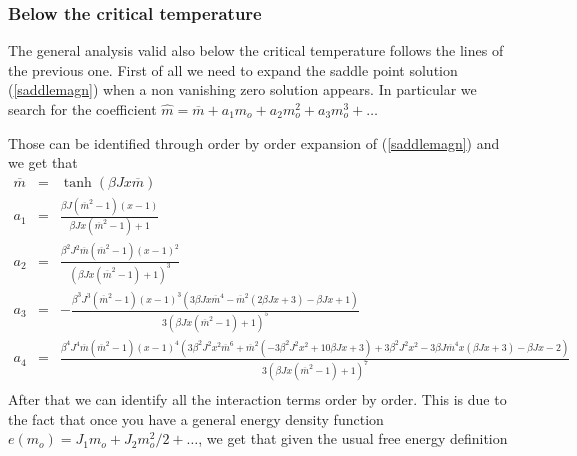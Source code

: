 \documentclass[aps,pre,noshowpacs]{revtex4}
\begin{document}
\subsubsection{Below the critical temperature}

The general analysis valid also below the critical temperature follows the lines of the previous one. 
First of all we need to expand the saddle point solution (\ref{saddlemagn}) when a non vanishing zero solution appears. 
In particular we search for the coefficient 
$\hat{m}=\overline{m} + a_1 m_o +a_2 m_o^2 +a_3 m_o^3 + \ldots $

Those can be identified through order by order expansion of (\ref{saddlemagn}) and we get that
\begin{eqnarray}
\overline{m}&=&\tanh( \beta J x \overline{m})\nonumber\\
a_1&=&\frac{\beta  J \left( \overline{m}^2-1\right) (x-1)}{\beta  J x\left( \overline{m}^2-1\right) +1}\nonumber \\
a_2 &=& \frac{\beta^2J^2 \overline{m} \left(\overline{m}^2-1\right) (x-1)^2}{\left(\beta J x \left(\overline{m}^2-1\right) +1\right)^3}\nonumber\\
a_3 &=&-\frac{\beta ^3 J^3 \left(\overline{m}^2-1\right) (x-1)^3 \left(3 \beta  J x \overline{m}^4 -\overline{m}^2 (2 \beta  J x+3)-\beta  J x+1\right)}{3 \left(\beta  J x\left(\overline{m}^2-1\right) +1\right)^5}\nonumber\\
a_4 &=&\frac{\beta ^4 J^4 \overline{m} \left(\overline{m}^2-1\right) (x-1)^4 \left(3 \beta ^2 J^2 x^2 \overline{m}^6 +\overline{m}^2 \left(-3 \beta ^2 J^2 x^2+10 \beta  J x+3\right)+3 \beta ^2 J^2 x^2-3 \beta  J \overline{m}^4 x (\beta  J x+3)-\beta  J x-2\right)}{3 \left(\beta  J x\left(\overline{m}^2-1\right) +1\right)^7} \nonumber\\
\end{eqnarray}
After that we can identify all the interaction terms order by order. This is due to the fact that once you have a general energy
density function $e(m_o)=J_1 m_o + J_2 m_o^2/2 +\ldots$, we get that given the usual free energy definition
\end{document}
